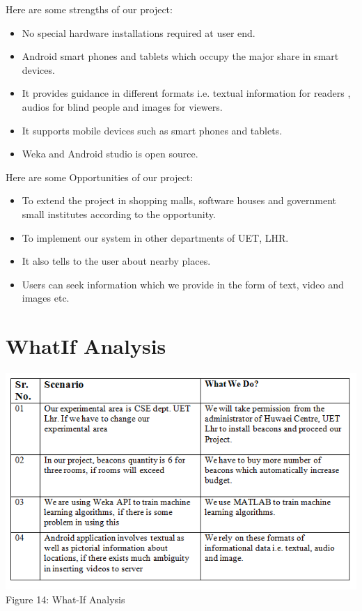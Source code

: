 \documentclass{article}
\begin{document}
Here are some strengths of our project:
\begin{itemize}
\item No special hardware installations required at user end. 
\item Android smart phones and tablets which occupy the major share in smart devices.
\item It provides guidance in different formats i.e. textual information for readers , audios for blind people and images for viewers.
\item It supports mobile devices such as  smart phones and tablets. 
\item Weka and Android studio is open source.
\end{itemize}

Here are some Opportunities of our project:
\begin{itemize}
\item To extend the project in shopping malls, software houses and government small institutes according to the opportunity.
\item To implement our system in other departments of UET, LHR.
\item It also tells to the user about nearby places.
\item Users can seek information which we provide in the form of text, video and images etc.
\end{itemize}


\section{WhatIf Analysis}
\begin{center}
\includegraphics[scale=0.8]{WhatIf}
\\Figure 14: What-If Analysis
\end{center}
\end{document}
